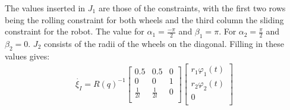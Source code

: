 \documentclass[a4paper, 20pt]{report}
\begin{document}
\begin{enumerate}
        The values inserted in $J_1$ are those of the constraints, with the
        first two rows being the rolling constraint for both wheels and the
        third column the sliding constraint for the robot.
        The value for $\alpha_1 = \frac{-\pi}{2}  $ and $\beta_1 =\pi$. For $\alpha_2
        = \frac{\pi}{2}$ and
        $\beta_2 = 0$. $J_2$ consists of the radii of
        the wheels on the diagonal.
        Filling in these values gives:
        \begin{align*}
            \dot{\xi_I} = R(q)^{-1} 
            \begin{bmatrix}
                0.5 & 0.5 & 0 \\
                0   & 0   & 1 \\
                \frac{1}{2l} & \frac{1}{2l} &0\\
            \end{bmatrix}
            \begin{bmatrix}
                r_1\varphi_1(t) \\
                r_2\varphi_2(t) \\
                0\\
            \end{bmatrix}
        \end{align*}


\end{enumerate}
\end{document}

